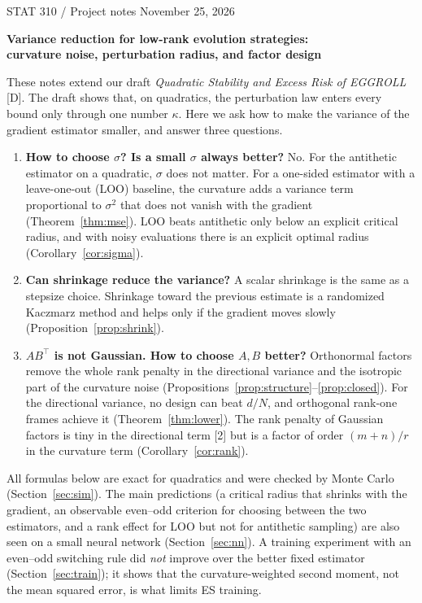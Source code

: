 \documentclass[11pt]{article}
\theoremstyle{remark}
\begin{document}
{\small STAT 310 / Project notes \hfill November 25, 2026}

\begin{center}
{\Large\textbf{Variance reduction for low-rank evolution strategies:}}\\[0.3em]
{\large\textbf{curvature noise, perturbation radius, and factor design}}
\end{center}

These notes extend our draft \emph{Quadratic Stability and Excess Risk of EGGROLL} [D]. The draft shows that, on quadratics, the perturbation law enters every bound only through one number $\kappa$. Here we ask how to make the variance of the gradient estimator smaller, and answer three questions.
\begin{enumerate}
\item \textbf{How to choose $\sigma$? Is a small $\sigma$ always better?} No. For the antithetic estimator on a quadratic, $\sigma$ does not matter. For a one-sided estimator with a leave-one-out (LOO) baseline, the curvature adds a variance term proportional to $\sigma^2$ that does not vanish with the gradient (Theorem~\ref{thm:mse}). LOO beats antithetic only below an explicit critical radius, and with noisy evaluations there is an explicit optimal radius (Corollary~\ref{cor:sigma}).
\item \textbf{Can shrinkage reduce the variance?} A scalar shrinkage is the same as a stepsize choice. Shrinkage toward the previous estimate is a randomized Kaczmarz method and helps only if the gradient moves slowly (Proposition~\ref{prop:shrink}).
\item \textbf{$AB^\top$ is not Gaussian. How to choose $A,B$ better?} Orthonormal factors remove the whole rank penalty in the directional variance and the isotropic part of the curvature noise (Propositions~\ref{prop:structure}--\ref{prop:closed}). For the directional variance, no design can beat $d/N$, and orthogonal rank-one frames achieve it (Theorem~\ref{thm:lower}). The rank penalty of Gaussian factors is tiny in the directional term [2] but is a factor of order $(m+n)/r$ in the curvature term (Corollary~\ref{cor:rank}).
\end{enumerate}
All formulas below are exact for quadratics and were checked by Monte Carlo (Section~\ref{sec:sim}). The main predictions (a critical radius that shrinks with the gradient, an observable even--odd criterion for choosing between the two estimators, and a rank effect for LOO but not for antithetic sampling) are also seen on a small neural network (Section~\ref{sec:nn}). A training experiment with an even--odd switching rule did \emph{not} improve over the better fixed estimator (Section~\ref{sec:train}); it shows that the curvature-weighted second moment, not the mean squared error, is what limits ES training.
\end{document}
